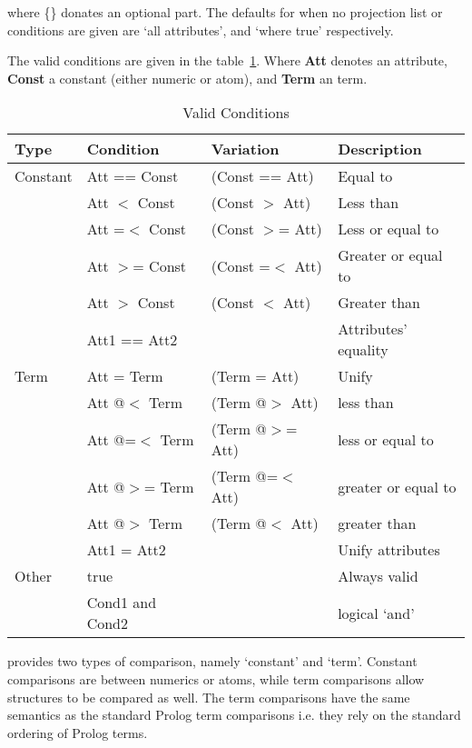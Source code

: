 where \{\} donates an optional part.
The defaults for when no projection list or conditions are given 
are  `all attributes', and `where true' respectively.



The valid conditions are given in the table~\ref{cond}. Where {\bf Att}
 denotes an attribute, {\bf Const} a constant (either numeric or atom), 
and {\bf Term} an \eclipse term.

\begin{table}
\begin{tabular}{||l|l|l|l||}
\hline
 Type      &  Condition     &  Variation       & Description \\ \hline
 Constant  &  Att == Const       &  (Const == Att)     & Equal to\\
           &  Att $<$ Const      &  (Const $>$ Att)    & Less than\\
           &  Att =$<$ Const     &  (Const $>$= Att)   & Less or equal to\\
           &  Att $>$= Const     &  (Const =$<$ Att)   & Greater or equal to\\
           &  Att $>$ Const      &  (Const $<$ Att)    & Greater than\\ 
           &  Att1 == Att2       &                     & Attributes' equality\\ 
\hline
 Term      &  Att = Term         &  (Term = Att)       & Unify\\
           &  Att @$<$ Term      &  (Term @$>$ Att)    & less than\\
           &  Att @=$<$ Term     &  (Term @$>$= Att)   & less or equal to\\
           &  Att @$>$= Term     &  (Term @=$<$ Att)   & greater or equal to\\
           &  Att @$>$ Term      &  (Term @$<$ Att)    & greater than\\ 
           &  Att1 = Att2        &                     & Unify attributes\\
\hline \hline
 Other     &  true               &                      & Always valid\\ 
           &  Cond1 and Cond2    &                      & logical `and'\\ \hline
\end{tabular}
\caption{ Valid Conditions}
\label{cond}
\end{table}



\eclipse provides two types of comparison, namely `constant'
and `term'.  Constant comparisons are between numerics
or atoms, while term comparisons allow structures
to be compared as well. The term comparisons have the same semantics
as the standard Prolog term comparisons i.e. they rely on the standard
ordering of Prolog terms.

